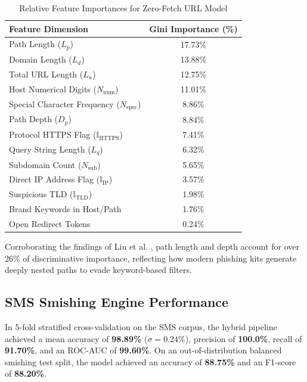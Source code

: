 \documentclass[conference]{IEEEtran}
\begin{document}
\begin{table}[htbp]
\caption{Relative Feature Importances for Zero-Fetch URL Model}
\begin{center}
\begin{tabular}{lc}
\toprule
\textbf{Feature Dimension} & \textbf{Gini Importance (\%)} \\
\midrule
Path Length ($L_p$) & 17.73\% \\
Domain Length ($L_d$) & 13.88\% \\
Total URL Length ($L_u$) & 12.75\% \\
Host Numerical Digits ($N_{\text{num}}$) & 11.01\% \\
Special Character Frequency ($N_{\text{spec}}$) & 8.86\% \\
Path Depth ($D_p$) & 8.84\% \\
Protocol HTTPS Flag ($\mathbb{I}_{\text{HTTPS}}$) & 7.41\% \\
Query String Length ($L_q$) & 6.32\% \\
Subdomain Count ($N_{\text{sub}}$) & 5.65\% \\
Direct IP Address Flag ($\mathbb{I}_{\text{IP}}$) & 3.57\% \\
Suspicious TLD ($\mathbb{I}_{\text{TLD}}$) & 1.98\% \\
Brand Keywords in Host/Path & 1.76\% \\
Open Redirect Tokens & 0.24\% \\
\bottomrule
\end{tabular}
\label{tab:feature_imp}
\end{center}
\end{table}

Corroborating the findings of Liu et al. \cite{liu2021detecting}, path length and depth account for over 26\% of discriminative importance, reflecting how modern phishing kits generate deeply nested paths to evade keyword-based filters.

\subsection{SMS Smishing Engine Performance}
In 5-fold stratified cross-validation on the SMS corpus, the hybrid pipeline achieved a mean accuracy of \textbf{98.89\%} ($\sigma = 0.24\%$), precision of \textbf{100.0\%}, recall of \textbf{91.70\%}, and an ROC-AUC of \textbf{99.60\%}. On an out-of-distribution balanced smishing test split, the model achieved an accuracy of \textbf{88.75\%} and an F1-score of \textbf{88.20\%}.
\end{document}
